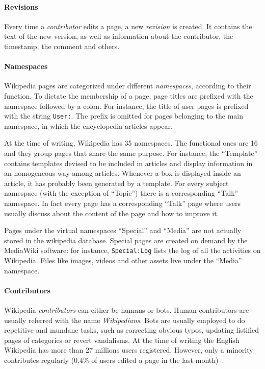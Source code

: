 \paragraph{Revisions}
Every time a \emph{contributor} edits a page, a new \emph{revision} is created.
It contains the text of the new version, as well as information about the contributor, the timestamp, the comment and others.

\paragraph{Namespaces}
Wikipedia pages are categorized under different \emph{namespaces}, according to their function.
To dictate the membership of a page, page titles are prefixed with the namespace followed by a colon.
For instance, the title of user pages is prefixed with the string \texttt{User:}.
The prefix is omitted for pages belonging to the main namespace, in which the encyclopedia articles appear.

At the time of writing, Wikipedia has 35 namespaces. The functional ones are 16 and they group pages that share the same purpose.
For instance, the ``Template'' contains templates devised to be included in articles and display information in an homogeneous way among articles.
Whenever a box is displayed inside an article, it has probably been generated by a template.
For every subject namespace (with the exception of ``Topic'') there is a corresponding ``Talk'' namespace.
In fact every page has a corresponding ``Talk'' page where users usually discuss about the content of the page and how to improve it.


Pages under the virtual namespaces ``Special'' and ``Media'' are not actually stored in the wikipedia database.
Special pages are created on demand by the MediaWiki software: for instance, \texttt{Special:Log} lists the log of all the activities on Wikipedia.
Files like images, videos and other assets live under the ``Media'' namespace.

\paragraph{Contributors}
Wikipedia \emph{contributors} can either be humans or bots.
Human contributors are usually referred with the name \emph{Wikipedians}.
Bots are usually employed to do repetitive and mundane tasks, such as correcting obvious typos, updating listified pages of categories or revert vandalisms.
At the time of writing the English Wikipedia has more than 27 millions users registered.
However, only a minority contributes regularly (0,4\% of users edited a page in the last month)~\cite{wiki:wikipedians}.

